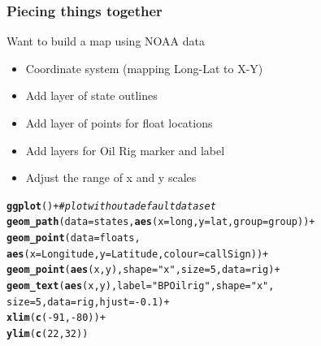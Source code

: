 \documentclass{beamer}\usepackage[]{graphicx}\usepackage[]{color}
\makeatletter
\newcommand{\hlnum}[1]{\textcolor[rgb]{0.686,0.059,0.569}{#1}}%
\newcommand{\hlstr}[1]{\textcolor[rgb]{0.192,0.494,0.8}{#1}}%
\newcommand{\hlcom}[1]{\textcolor[rgb]{0.678,0.584,0.686}{\textit{#1}}}%
\newcommand{\hlopt}[1]{\textcolor[rgb]{0,0,0}{#1}}%
\newcommand{\hlstd}[1]{\textcolor[rgb]{0.345,0.345,0.345}{#1}}%
\newcommand{\hlkwc}[1]{\textcolor[rgb]{0.333,0.667,0.333}{#1}}%
\newcommand{\hlkwd}[1]{\textcolor[rgb]{0.737,0.353,0.396}{\textbf{#1}}}%
\newenvironment{kframe}{%
 \def\at@end@of@kframe{}%
 \ifinner\ifhmode%
  \def\at@end@of@kframe{\end{minipage}}%
  \begin{minipage}{\columnwidth}%
 \fi\fi%
 \def\FrameCommand##1{\hskip\@totalleftmargin \hskip-\fboxsep
 \colorbox{shadecolor}{##1}\hskip-\fboxsep
     \hskip-\linewidth \hskip-\@totalleftmargin \hskip\columnwidth}%
 \MakeFramed {\advance\hsize-\width
   \@totalleftmargin\z@ \linewidth\hsize
   \@setminipage}}%
 {\par\unskip\endMakeFramed%
 \at@end@of@kframe}
\newenvironment{knitrout}{}{} %
\makeatother
\begin{document}
\begin{frame}[fragile]
\frametitle{Piecing things together}

Want to build a map using NOAA data
\begin{itemize}
  \item Coordinate system (mapping Long-Lat to X-Y)
  \item Add layer of state outlines
  \item Add layer of points for float locations
  \item Add layers for Oil Rig marker and label
  \item Adjust the range of x and y scales
\end{itemize}

\begin{knitrout}\footnotesize
{}\color{fgcolor}\begin{kframe}
\begin{alltt}
\hlkwd{ggplot}\hlstd{()} \hlopt{+}   \hlcom{# plot without a default data set}
 \hlkwd{geom_path}\hlstd{(}\hlkwc{data}\hlstd{=states,} \hlkwd{aes}\hlstd{(}\hlkwc{x}\hlstd{=long,} \hlkwc{y}\hlstd{=lat,} \hlkwc{group}\hlstd{=group))} \hlopt{+}
 \hlkwd{geom_point}\hlstd{(}\hlkwc{data}\hlstd{=floats,}
            \hlkwd{aes}\hlstd{(}\hlkwc{x}\hlstd{=Longitude,} \hlkwc{y}\hlstd{=Latitude,} \hlkwc{colour}\hlstd{=callSign))} \hlopt{+}
 \hlkwd{geom_point}\hlstd{(}\hlkwd{aes}\hlstd{(x, y),} \hlkwc{shape}\hlstd{=}\hlstr{"x"}\hlstd{,} \hlkwc{size}\hlstd{=}\hlnum{5}\hlstd{,} \hlkwc{data}\hlstd{=rig)} \hlopt{+}
 \hlkwd{geom_text}\hlstd{(}\hlkwd{aes}\hlstd{(x, y),} \hlkwc{label}\hlstd{=}\hlstr{"BP Oil rig"}\hlstd{,} \hlkwc{shape}\hlstd{=}\hlstr{"x"}\hlstd{,}
       \hlkwc{size}\hlstd{=}\hlnum{5}\hlstd{,} \hlkwc{data}\hlstd{=rig,} \hlkwc{hjust} \hlstd{=} \hlopt{-}\hlnum{0.1}\hlstd{)} \hlopt{+}
 \hlkwd{xlim}\hlstd{(}\hlkwd{c}\hlstd{(}\hlopt{-}\hlnum{91}\hlstd{,} \hlopt{-}\hlnum{80}\hlstd{))} \hlopt{+}
 \hlkwd{ylim}\hlstd{(}\hlkwd{c}\hlstd{(}\hlnum{22}\hlstd{,}\hlnum{32}\hlstd{))}
\end{alltt}
\end{kframe}
\end{knitrout}
\end{frame}


\end{document}

